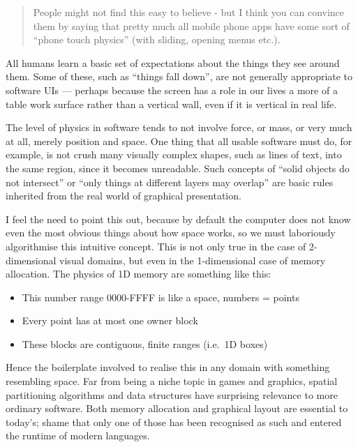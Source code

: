 \documentclass[english,submission]{programming}
\providecommand{\tightlist}{}%
\begin{document}
  \begin{quote}
  People might not find this easy to believe - but I think you can
  convince them by saying that pretty much all mobile phone apps have some
  sort of ``phone touch physics'' (with sliding, opening menus etc.).
  \end{quote}

  All humans learn a basic set of expectations about the things they see
  around them. Some of these, such as ``things fall down'', are not
  generally appropriate to software UIs --- perhaps because the screen has
  a role in our lives a more of a table work surface rather than a
  vertical wall, even if it is vertical in real life.

  The level of physics in software tends to not involve force, or mass, or
  very much at all, merely position and space. One thing that all usable
  software must do, for example, is not crush many visually complex
  shapes, such as lines of text, into the same region, since it becomes
  unreadable. Such concepts of ``solid objects do not intersect'' or
  ``only things at different layers may overlap'' are basic rules
  inherited from the real world of graphical presentation.

  I feel the need to point this out, because by default the computer does
  not know even the most obvious things about how space works, so we must
  laboriously algorithmise this intuitive concept. This is not only true
  in the case of 2-dimensional visual domains, but even in the
  1-dimensional case of memory allocation. The physics of 1D memory are
  something like this:

  \begin{itemize}
  \tightlist
  \item
    This number range 0000-FFFF is like a space, numbers = points
  \item
    Every point has at most one owner block
  \item
    These blocks are contiguous, finite ranges (i.e.~1D boxes)
  \end{itemize}

  Hence the boilerplate involved to realise this in any domain with
  something resembling space. Far from being a niche topic in games and
  graphics, spatial partitioning algorithms and data structures have
  surprising relevance to more ordinary software. Both memory allocation
  and graphical layout are essential to today's; shame that only one of
  those has been recognised as such and entered the runtime of modern
  languages.
\end{document}
